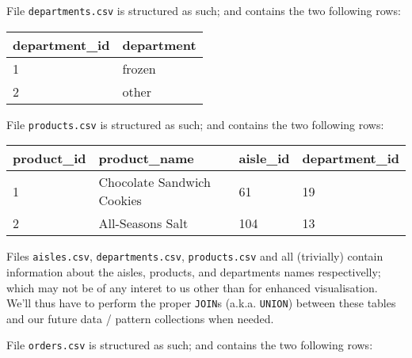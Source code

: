 \documentclass[11pt]{article}
\begin{document}
File \texttt{departments.csv} is structured as such; and contains the
two following rows:

\begin{longtable}[]{@{}ll@{}}
\toprule
department\_id & department\tabularnewline
\midrule
\endhead
1 & frozen\tabularnewline
2 & other\tabularnewline
\bottomrule
\end{longtable}

File \texttt{products.csv} is structured as such; and contains the two
following rows:

\begin{longtable}[]{@{}llll@{}}
\toprule
product\_id & product\_name & aisle\_id & department\_id\tabularnewline
\midrule
\endhead
1 & Chocolate Sandwich Cookies & 61 & 19\tabularnewline
2 & All-Seasons Salt & 104 & 13\tabularnewline
\bottomrule
\end{longtable}

Files \texttt{aisles.csv}, \texttt{departments.csv},
\texttt{products.csv} and all (trivially) contain information about the
aisles, products, and departments names respectivelly; which may not be
of any interet to us other than for enhanced visualisation. We'll thus
have to perform the proper \texttt{JOIN}s (a.k.a. \texttt{UNION})
between these tables and our future data / pattern collections when
needed.

File \texttt{orders.csv} is structured as such; and contains the two
following rows:
\end{document}
